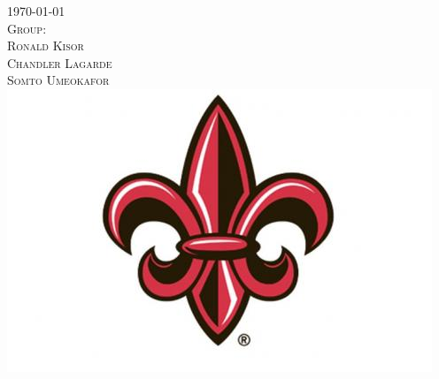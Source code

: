 \documentclass[12pt]{article}
\begin{document}
\begin{titlepage}


{\textsc{\large \today}}\\[0.5cm] %



\textsc{\large Group:}\\[0.1cm]
\textsc{Ronald Kisor}\\
\textsc{Chandler Lagarde}\\
\textsc{Somto Umeokafor}
\\[0.5cm]


\includegraphics[width=5in]{UL_logo.jpg}\\[1cm] %
 

\vfill %

\end{titlepage}
\end{document}
